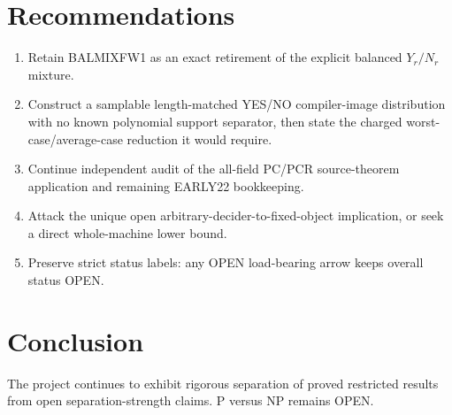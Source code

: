 \documentclass[11pt]{article}
\begin{document}
\section{Recommendations}
\begin{enumerate}
\item Retain BALMIXFW1 as an exact retirement of the explicit balanced \(Y_r/N_r\) mixture.
\item Construct a samplable length-matched YES/NO compiler-image distribution with no known polynomial support separator, then state the charged worst-case/average-case reduction it would require.
\item Continue independent audit of the all-field PC/PCR source-theorem application and remaining EARLY22 bookkeeping.
\item Attack the unique open arbitrary-decider-to-fixed-object implication, or seek a direct whole-machine lower bound.
\item Preserve strict status labels: any OPEN load-bearing arrow keeps overall status OPEN.
\end{enumerate}

\section{Conclusion}
The project continues to exhibit rigorous separation of proved restricted results from open separation-strength claims.  P versus NP remains OPEN.

\end{document}
